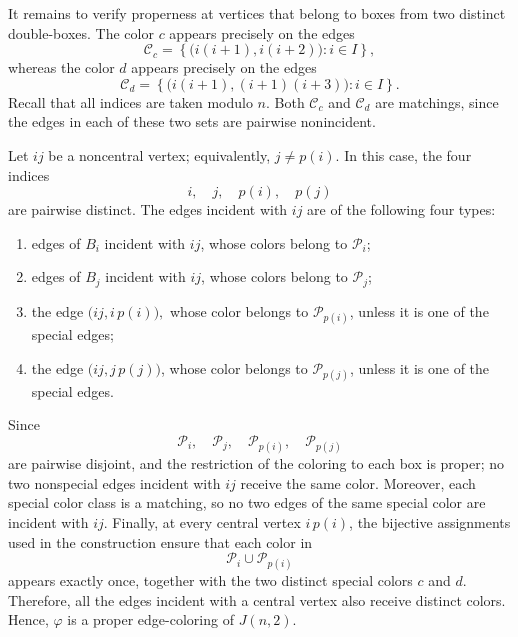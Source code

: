 \documentclass{article}
\begin{document}
It remains to verify properness at vertices that belong to boxes from
two distinct double-boxes. 
The color $c$ appears
precisely on the edges
$$
\mathcal{C}_c
=
\left\{
\bigl(i(i+1),i(i+2)\bigr):i\in I
\right\},
$$
whereas the color $d$ appears precisely on the edges
$$
\mathcal{C}_d
=
\left\{
\bigl(i(i+1),(i+1)(i+3)\bigr):i\in I
\right\}.
$$
Recall that all indices are taken modulo $n$. 
Both $\mathcal{C}_c$ and $\mathcal{C}_d$ are matchings, since the
edges in each of these two sets are pairwise nonincident.


Let $ij$ be a noncentral vertex; equivalently, $j\neq p(i).$
In this case, the four indices
$$
i,\quad j,\quad p(i),\quad p(j)
$$
are pairwise distinct.
The edges incident with $ij$ are of the following four types:
\begin{enumerate}
    \item edges of $B_i$ incident with $ij$, whose colors belong to
    $\mathcal{P}_i$;
    \item edges of $B_j$ incident with $ij$, whose colors belong to
    $\mathcal{P}_j$;
    \item the edge $\bigl(ij,i\,p(i)\bigr),$
    whose color belongs to $\mathcal{P}_{p(i)}$, unless it is one of
    the special edges;
    \item the edge $\bigl(ij,j\,p(j)\bigr)$,
    whose color belongs to $\mathcal{P}_{p(j)}$, unless it is one of
    the special edges.
\end{enumerate}
Since
$$
\mathcal{P}_i,\quad
\mathcal{P}_j,\quad
\mathcal{P}_{p(i)},\quad
\mathcal{P}_{p(j)}
$$
are pairwise disjoint, and the restriction of the coloring to each box
is proper; no two nonspecial edges incident with $ij$ receive the same
color. Moreover, each special color class is a matching, so no two
edges of the same special color are incident with $ij$.
Finally, at every central vertex $i\,p(i)$, the bijective assignments
used in the construction ensure that each color in
$$
\mathcal{P}_i\cup\mathcal{P}_{p(i)}
$$
appears exactly once, together with the two distinct special colors
$c$ and $d$. Therefore, all the edges incident with a central vertex
also receive distinct colors. Hence, $\varphi$ is a proper
edge-coloring of $J(n,2)$.

\end{document}

